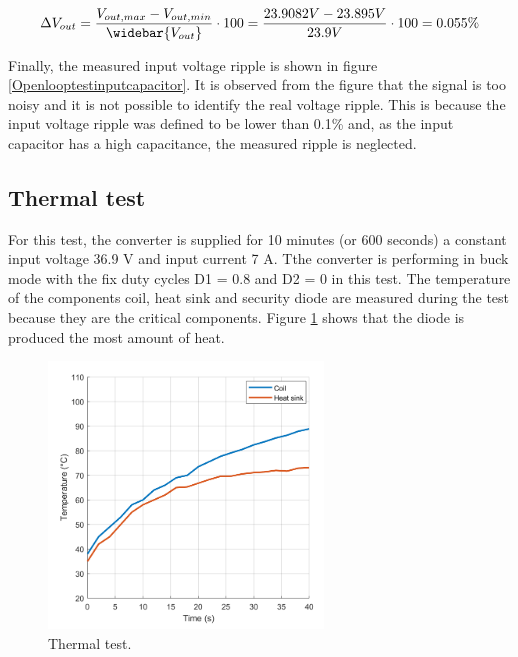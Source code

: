 \begin{equation} \label{eq:output_voltage_rippleexperiment}
\Delta V_{out} = \frac{V_{out,max}-V_{out,min}}{\widebar{V_{out}}} \cdot 100 = \frac{23.9082V - 23.895V }{23.9V} \cdot 100 = 0.055\%
\end{equation}

Finally, the measured input voltage ripple is shown in figure \ref{Openlooptestinputcapacitor}. It is observed from the figure that the signal is too noisy and it is not possible to identify the real voltage ripple. This is because the input voltage ripple was defined to be lower than 0.1\% and, as the input capacitor has a high capacitance, the measured ripple is neglected. 

\subsection{Thermal test}

For this test, the converter is supplied for 10 minutes (or 600 seconds) a constant input voltage 36.9 V and input current 7 A. Tthe converter is performing in buck mode with the fix duty cycles D1 = 0.8 and D2 = 0 in this test. The temperature of the components coil, heat sink and security diode are measured during the test because they are the critical components. Figure \ref{Testthermal} shows that the diode is produced the most amount of heat.

\begin{figure}[H]
	\begin{center}
		\includegraphics[width=0.65\textwidth]{../Pictures/P1/Test/Thermal_test_with_heat_sink}
		\caption{Thermal test.}
		\label{Testthermal}
	\end{center}	
\end{figure}

